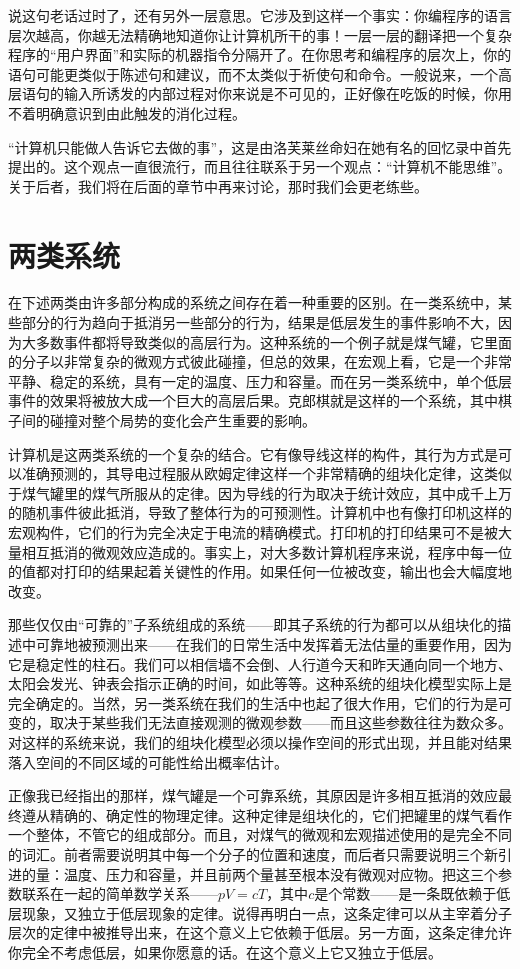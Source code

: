 说这句老话过时了，还有另外一层意思。它涉及到这样一个事实：你编程序的语言层次越高，你越无法精确地知道你让计算机所干的事！一层一层的翻译把一个复杂程序的“用户界面”和实际的机器指令分隔开了。在你思考和编程序的层次上，你的语句可能更类似于陈述句和建议，而不太类似于祈使句和命令。一般说来，一个高层语句的输入所诱发的内部过程对你来说是不可见的，正好像在吃饭的时候，你用不着明确意识到由此触发的消化过程。

“计算机只能做人告诉它去做的事”，这是由洛芙莱丝命妇在她有名的回忆录中首先提出的。这个观点一直很流行，而且往往联系于另一个观点：“计算机不能思维”。关于后者，我们将在后面的章节中再来讨论，那时我们会更老练些。

\section{两类系统}

在下述两类由许多部分构成的系统之间存在着一种重要的区别。在一类系统中，某些部分的行为趋向于抵消另一些部分的行为，结果是低层发生的事件影响不大，因为大多数事件都将导致类似的高层行为。这种系统的一个例子就是煤气罐，它里面的分子以非常复杂的微观方式彼此碰撞，但总的效果，在宏观上看，它是一个非常平静、稳定的系统，具有一定的温度、压力和容量。而在另一类系统中，单个低层事件的效果将被放大成一个巨大的高层后果。克郎棋就是这样的一个系统，其中棋子间的碰撞对整个局势的变化会产生重要的影响。

计算机是这两类系统的一个复杂的结合。它有像导线这样的构件，其行为方式是可以准确预测的，其导电过程服从欧姆定律这样一个非常精确的组块化定律，这类似于煤气罐里的煤气所服从的定律。因为导线的行为取决于统计效应，其中成千上万的随机事件彼此抵消，导致了整体行为的可预测性。计算机中也有像打印机这样的宏观构件，它们的行为完全决定于电流的精确模式。打印机的打印结果可不是被大量相互抵消的微观效应造成的。事实上，对大多数计算机程序来说，程序中每一位的值都对打印的结果起着关键性的作用。如果任何一位被改变，输出也会大幅度地改变。

那些仅仅由“可靠的”子系统组成的系统——即其子系统的行为都可以从组块化的描述中可靠地被预测出来——在我们的日常生活中发挥着无法估量的重要作用，因为它是稳定性的柱石。我们可以相信墙不会倒、人行道今天和昨天通向同一个地方、太阳会发光、钟表会指示正确的时间，如此等等。这种系统的组块化模型实际上是完全确定的。当然，另一类系统在我们的生活中也起了很大作用，它们的行为是可变的，取决于某些我们无法直接观测的微观参数——而且这些参数往往为数众多。对这样的系统来说，我们的组块化模型必须以操作空间的形式出现，并且能对结果落入空间的不同区域的可能性给出概率估计。

正像我已经指出的那样，煤气罐是一个可靠系统，其原因是许多相互抵消的效应最终遵从精确的、确定性的物理定律。这种定律是组块化的，它们把罐里的煤气看作一个整体，不管它的组成部分。而且，对煤气的微观和宏观描述使用的是完全不同的词汇。前者需要说明其中每一个分子的位置和速度，而后者只需要说明三个新引进的量：温度、压力和容量，并且前两个量甚至根本没有微观对应物。把这三个参数联系在一起的简单数学关系——$pV=cT$，其中$c$是个常数——是一条既依赖于低层现象，又独立于低层现象的定律。说得再明白一点，这条定律可以从主宰着分子层次的定律中被推导出来，在这个意义上它依赖于低层。另一方面，这条定律允许你完全不考虑低层，如果你愿意的话。在这个意义上它又独立于低层。


